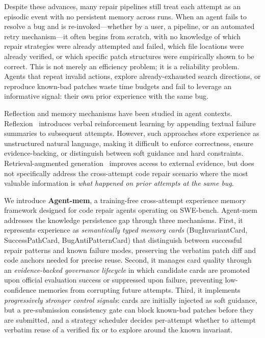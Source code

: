 \documentclass[runningheads]{llncs}
\begin{document}
Despite these advances, many repair pipelines still treat each attempt as an episodic event with no persistent memory across runs. When an agent fails to resolve a bug and is re-invoked---whether by a user, a pipeline, or an automated retry mechanism---it often begins from scratch, with no knowledge of which repair strategies were already attempted and failed, which file locations were already verified, or which specific patch structures were empirically shown to be correct. This is not merely an efficiency problem; it is a reliability problem. Agents that repeat invalid actions, explore already-exhausted search directions, or reproduce known-bad patches waste time budgets and fail to leverage an informative signal: their own prior experience with the same bug.

Reflection and memory mechanisms have been studied in agent contexts. Reflexion~\cite{shinn2023reflexion} introduces verbal reinforcement learning by appending textual failure summaries to subsequent attempts. However, such approaches store experience as unstructured natural language, making it difficult to enforce correctness, ensure evidence-backing, or distinguish between soft guidance and hard constraints. Retrieval-augmented generation~\cite{lewis2020rag} improves access to external evidence, but does not specifically address the cross-attempt code repair scenario where the most valuable information is \emph{what happened on prior attempts at the same bug}.

We introduce \textbf{Agent-mem}, a training-free cross-attempt experience memory framework designed for code repair agents operating on SWE-bench. Agent-mem addresses the knowledge persistence gap through three mechanisms. First, it represents experience as \emph{semantically typed memory cards} (BugInvariantCard, SuccessPathCard, BugAntiPatternCard) that distinguish between successful repair patterns and known failure modes, preserving the verbatim patch diff and code anchors needed for precise reuse. Second, it manages card quality through an \emph{evidence-backed governance lifecycle} in which candidate cards are promoted upon official evaluation success or suppressed upon failure, preventing low-confidence memories from corrupting future attempts. Third, it implements \emph{progressively stronger control signals}: cards are initially injected as soft guidance, but a pre-submission consistency gate can block known-bad patches before they are submitted, and a strategy scheduler decides per-attempt whether to attempt verbatim reuse of a verified fix or to explore around the known invariant.
\end{document}
